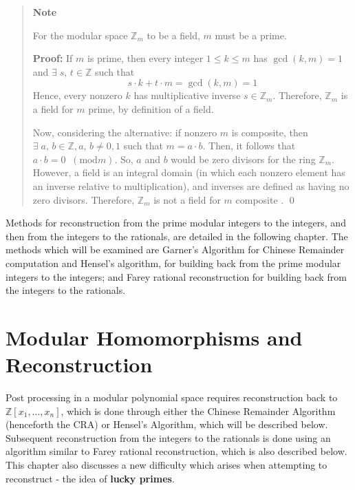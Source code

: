 \documentclass[letterpaper,12pt,titlepage,oneside,final]{book}
\newenvironment{note}{\begin{quote}%
  \textbf{Note }%
  \quad
}{%
\end{quote}%
}
\begin{document}
\begin{note}
  For the modular space ${\mathbb{Z}_m}$ to be a field, ${m}$ must be a prime.  

  \textbf{Proof:} If ${m}$ is prime, then every integer ${1 \leq k \leq m}$ has ${\gcd(k, m) = 1}$ and ${\exists \; s, \, t \in \mathbb{Z}}$ such that 
  \begin{equation*}
    s \cdot k + t \cdot m = \gcd(k, m) = 1
  \end{equation*}
  Hence, every nonzero ${k}$ has multiplicative inverse ${s \in \mathbb{Z}_m}$.  Therefore, ${\mathbb{Z}_m}$ is a field for ${m}$ prime, by definition of a field.

  Now, considering the alternative: if nonzero ${m}$ is composite, then ${\exists \; a, \, b \in \mathbb{Z}, a, \, b \neq 0, 1}$ such that ${m = a \cdot b}$.  Then, it follows that ${a \cdot b = 0 \;\;(\textrm{mod} m)}$.  So, ${a}$ and ${b}$ would be zero divisors for the ring ${\mathbb{Z}_m}$.  However, a field is an integral domain (in which each nonzero element has an inverse relative to multiplication), and inverses are defined as having no zero divisors.  Therefore, ${\mathbb{Z}_m}$ is not a field for ${m}$ composite \cite{Fraleigh}. \qed
\end{note} 

Methods for reconstruction from the prime modular integers to the integers, and then from the integers to the rationals, are detailed in the following chapter.  The methods which will be examined are Garner's Algorithm for Chinese Remainder computation and Hensel's algorithm, for building back from the prime modular integers to the integers; and Farey rational reconstruction for building back from the integers to the rationals.

\chapter{Modular Homomorphisms and Reconstruction}

Post processing in a modular polynomial space requires reconstruction back to ${\mathbb{Z}[x_1, \ldots, x_n]}$, which is done through either the Chinese Remainder Algorithm (henceforth the CRA) or Hensel's Algorithm, which will be described below.  Subsequent reconstruction from the integers to the rationals is done using an algorithm similar to Farey rational reconstruction, which is also described below.  This chapter also discusses a new difficulty which arises when attempting to reconstruct - the idea of \textbf{lucky primes}. 
\end{document}
